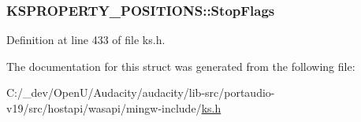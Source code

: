 \subsubsection[{\texorpdfstring{Stop\+Flags}{StopFlags}}]{ K\+S\+P\+R\+O\+P\+E\+R\+T\+Y\+\_\+\+P\+O\+S\+I\+T\+I\+O\+N\+S\+::\+Stop\+Flags}\hypertarget{struct_k_s_p_r_o_p_e_r_t_y___p_o_s_i_t_i_o_n_s_ae2d7844ea91228b76bcf272a0be2607a}{}\label{struct_k_s_p_r_o_p_e_r_t_y___p_o_s_i_t_i_o_n_s_ae2d7844ea91228b76bcf272a0be2607a}


Definition at line 433 of file ks.\+h.



The documentation for this struct was generated from the following file\+:\begin{DoxyCompactItemize}
\item 
C\+:/\+\_\+dev/\+Open\+U/\+Audacity/audacity/lib-\/src/portaudio-\/v19/src/hostapi/wasapi/mingw-\/include/\hyperlink{ks_8h}{ks.\+h}\end{DoxyCompactItemize}
